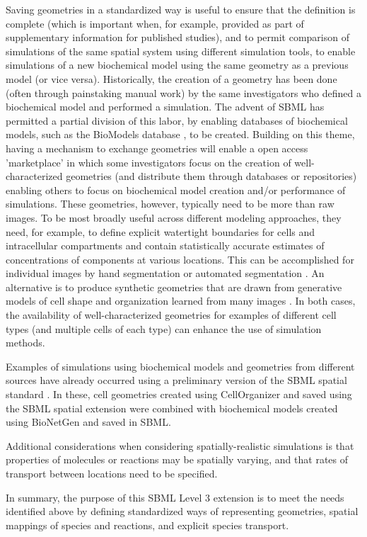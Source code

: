\begin{blockChanged}
Saving geometries in a standardized way is useful to ensure that the definition is complete (which is important when, for example, provided as part of supplementary information for published studies), and to permit comparison of simulations of the same spatial system using different simulation tools, to enable simulations of a new biochemical model using the same geometry as a previous model (or vice versa). Historically, the creation of a geometry has been done (often through painstaking manual work) by the same investigators who defined a biochemical model and performed a simulation. The advent of SBML has permitted a partial division of this labor, by enabling databases of biochemical models, such as the BioModels database \citep{lenovere:2006, li:2010}, to be created. Building on this theme, having a mechanism to exchange geometries will enable a open access 'marketplace' in which some investigators focus on the creation of well-characterized geometries (and distribute them through databases or repositories) enabling others to focus on biochemical model creation and/or performance of simulations. These geometries, however, typically need to be more than raw images. To be most broadly useful across different modeling approaches, they need, for example, to define explicit watertight boundaries for cells and intracellular compartments and contain statistically accurate estimates of concentrations of components at various locations. This can be accomplished for individual images by hand segmentation \citep{loew:2001} or automated segmentation \citep{perez:2014}. An alternative is to produce synthetic geometries that are drawn from generative models of cell shape and organization learned from many images \citep{zhao:2007}. In both cases, the availability of well-characterized geometries for examples of different cell types (and multiple cells of each type) can enhance the use of simulation methods.

Examples of simulations using biochemical models and geometries from different sources have already occurred using a preliminary version of the SBML spatial standard \citep{sullivan:2015, donovan:2016}. In these, cell geometries created using CellOrganizer and saved using the SBML spatial extension were combined with biochemical models created using BioNetGen and saved in SBML.

Additional considerations when considering spatially-realistic simulations is that properties of molecules or reactions may be spatially varying, and that rates of transport between locations need to be specified.

In summary, the purpose of this SBML Level 3 extension is to meet the needs identified above by defining standardized ways of representing geometries, spatial mappings of species and reactions, and explicit species transport.
\end{blockChanged}



